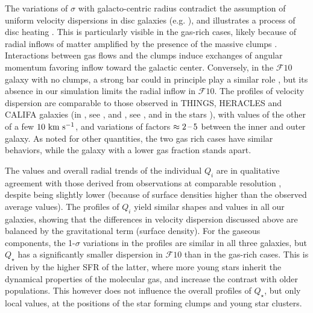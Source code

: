 \documentclass[useAMS,usenatbib]{mnras}
\newcommand{\gs}{\ensuremath{\mathcal{F}10}\xspace}
\begin{document}
The variations of $\sigma$ with galacto-centric radius contradict the assumption of uniform velocity dispersions in disc galaxies (e.g. \citealt{Obreschkow2016}), and illustrates a process of disc heating \citep{Goldbaum2015, Zhang2016}. This is particularly visible in the gas-rich cases, likely because of radial inflows of matter amplified by the presence of the massive clumps \citep{Noguchi1999, Dekel2013}. Interactions between gas flows and the clumps induce exchanges of angular momentum favoring inflow toward the galactic center. Conversely, in the \gs galaxy with no clumps, a strong bar could in principle play a similar role \citep{Romeo2015, Emsellem2015}, but its absence in our simulation limits the radial inflow in \gs. The profiles of velocity dispersion are comparable to those observed in THINGS, HERACLES and CALIFA galaxies (in \hi, see \citealt{Tamburro2009}, \hi and \htwo, see \citealt{Romeo2017}, and in the stars \citealt{Mogotsi2019}), with values of the other of a few $10 \mathrm{~km\ s^{-1}}$, and variations of factors $\approx 2\textrm{\,--\,} 5$ between the inner and outer galaxy. As noted for other quantities, the two gas rich cases have similar behaviors, while the galaxy with a lower gas fraction stands apart.

The values and overall radial trends of the individual $Q_i$ are in qualitative agreement with those derived from observations at comparable resolution \citep[his figure 1]{Romeo2020}, despite being slightly lower (because of surface densities higher than the observed average values). The profiles of $Q_i$ yield similar shapes and values in all our galaxies, showing that the differences in velocity dispersion discussed above are balanced by the gravitational term (surface density). For the gaseous components, the 1-$\sigma$ variations in the profiles are similar in all three galaxies, but $Q_\star$ has a significantly smaller dispersion in \gs than in the gas-rich cases. This is driven by the higher SFR of the latter, where more young stars inherit the dynamical properties of the molecular gas, and increase the contrast with older populations. This however does not influence the overall profiles of $Q_\star$, but only local values, at the positions of the star forming clumps and young star clusters.
\end{document}
